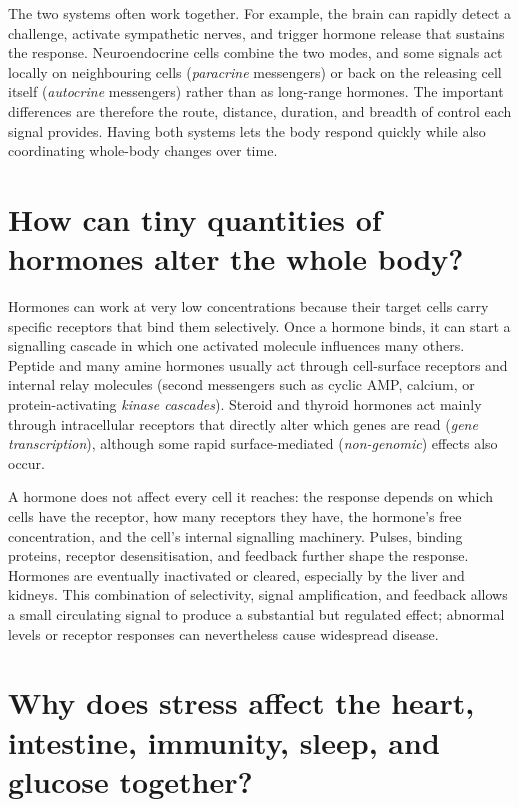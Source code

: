 \documentclass[11pt,oneside]{report}
\begin{document}
The two systems often work together. For example, the brain can rapidly detect
a challenge, activate sympathetic nerves, and trigger hormone release that
sustains the response. Neuroendocrine cells combine the two modes, and some
signals act locally on neighbouring cells (\emph{paracrine} messengers) or back
on the releasing cell itself (\emph{autocrine} messengers) rather than as
long-range hormones. The important differences are therefore the route,
distance, duration, and breadth of control each signal provides. Having both
systems lets the body respond quickly while also coordinating whole-body
changes over time.

\section{How can tiny quantities of hormones alter the whole body?}

Hormones can work at very low concentrations because their target cells carry
specific receptors that bind them selectively. Once a hormone binds, it can
start a signalling cascade in which one activated molecule influences many
others. Peptide and many amine hormones usually act through cell-surface
receptors and internal relay molecules (second messengers such as cyclic AMP,
calcium, or protein-activating \emph{kinase cascades}). Steroid and thyroid
hormones act mainly through intracellular receptors that directly alter which
genes are read (\emph{gene transcription}), although some rapid surface-mediated
(\emph{non-genomic}) effects also occur.

A hormone does not affect every cell it reaches: the response depends on which
cells have the receptor, how many receptors they have, the hormone's free
concentration, and the cell's internal signalling machinery. Pulses, binding
proteins, receptor desensitisation, and feedback further shape the response.
Hormones are eventually inactivated or cleared, especially by the liver and
kidneys. This combination of selectivity, signal amplification, and feedback
allows a small circulating signal to produce a substantial but regulated
effect; abnormal levels or receptor responses can nevertheless cause widespread
disease.

\section{Why does stress affect the heart, intestine, immunity, sleep, and glucose together?}
\end{document}
